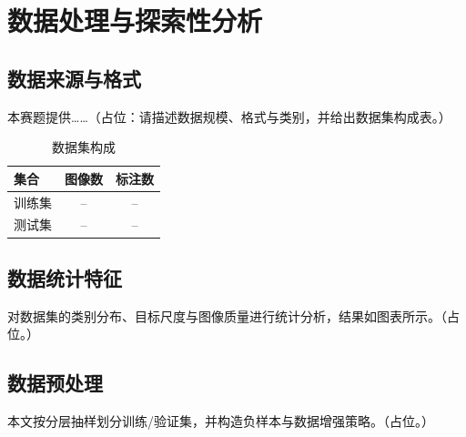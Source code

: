 \section{数据处理与探索性分析}

\subsection{数据来源与格式}
本赛题提供……（占位：请描述数据规模、格式与类别，并给出数据集构成表。）

\begin{table}[H]
\centering
{}
\caption{数据集构成}\label{tab:dataset}
\begin{tabular}{lcc}
  \toprule
  集合 & 图像数 & 标注数 \\
  \midrule
  训练集 & -- & -- \\
  测试集 & -- & -- \\
  \bottomrule
\end{tabular}
\end{table}

\subsection{数据统计特征}
对数据集的类别分布、目标尺度与图像质量进行统计分析，结果如图表所示。（占位。）

\subsection{数据预处理}
本文按分层抽样划分训练/验证集，并构造负样本与数据增强策略。（占位。）
